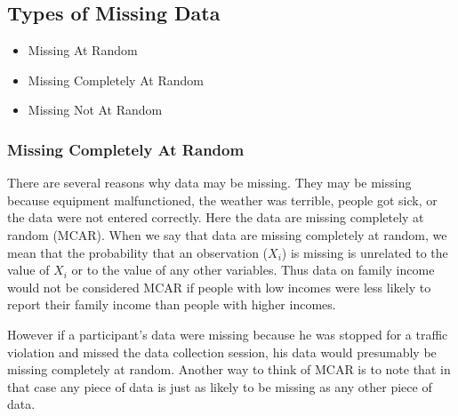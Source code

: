 \documentclass[12pt]{article} %
\begin{document}
\subsection{Types of Missing Data}

\begin{itemize}
\item Missing At Random
\item Missing Completely At Random
\item Missing Not At Random
\end{itemize}



\subsubsection{Missing Completely At Random}

There are several reasons why data may be missing. They may be missing because equipment malfunctioned, the weather was terrible, people got sick, or the data were not entered correctly. Here the data are missing completely at random (MCAR). When we say that data are missing completely at random, we mean that the probability that an observation ($X_i$) is missing is unrelated to the value of $X_i$ or to the value of any other variables. Thus data on family income would not be considered MCAR if people with low incomes were less likely to report their family income than people with higher incomes.

However if a participant's data were missing because he was stopped for a traffic violation and missed the data collection session, his data would presumably be missing completely at random. Another way to think of MCAR is to note that in that case any piece of data is just as likely to be missing as any other piece of data.



%
%
%
%
%
%
\end{document}

